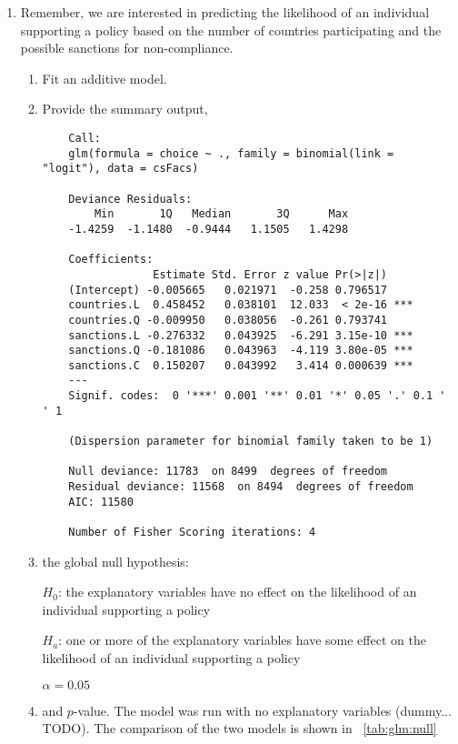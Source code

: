 \documentclass[12pt,letterpaper]{article}
\begin{document}
\begin{enumerate}
	\item
	Remember, we are interested in predicting the likelihood of an individual supporting a policy based on the number of countries participating and the possible sanctions for non-compliance.
	\begin{enumerate}
		\item [] Fit an additive model. 
      
		
		\item Provide the summary output, 

    \begin{lstlisting}
    Call:
    glm(formula = choice ~ ., family = binomial(link = "logit"), data = csFacs)

    Deviance Residuals: 
        Min       1Q   Median       3Q      Max  
    -1.4259  -1.1480  -0.9444   1.1505   1.4298  

    Coefficients:
                 Estimate Std. Error z value Pr(>|z|)    
    (Intercept) -0.005665   0.021971  -0.258 0.796517    
    countries.L  0.458452   0.038101  12.033  < 2e-16 ***
    countries.Q -0.009950   0.038056  -0.261 0.793741    
    sanctions.L -0.276332   0.043925  -6.291 3.15e-10 ***
    sanctions.Q -0.181086   0.043963  -4.119 3.80e-05 ***
    sanctions.C  0.150207   0.043992   3.414 0.000639 ***
    ---
    Signif. codes:  0 '***' 0.001 '**' 0.01 '*' 0.05 '.' 0.1 ' ' 1

    (Dispersion parameter for binomial family taken to be 1)

    Null deviance: 11783  on 8499  degrees of freedom
    Residual deviance: 11568  on 8494  degrees of freedom
    AIC: 11580

    Number of Fisher Scoring iterations: 4

    \end{lstlisting}
		
		\item the global null hypothesis:
		
		$H_0$: the explanatory variables have no effect on the likelihood of an individual supporting a policy
		
		$H_a$: one or more of the explanatory variables have some effect on the likelihood of an individual supporting a policy

    $\alpha = 0.05$
    
		\item and $p$-value. 
      The model was run with no explanatory variables (dummy... TODO).  The comparison of the two models is shown in ~\ref{tab:glm:null}


\end{enumerate}
\end{enumerate}
\end{document}
